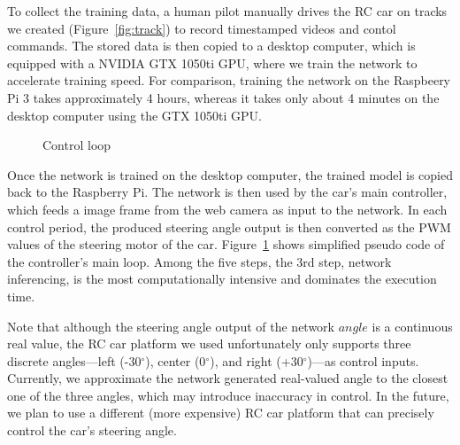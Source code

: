 To collect the training data, a human pilot manually drives the RC car
on tracks we created (Figure~\ref{fig:track}) to record
timestamped videos and contol commands. The stored data is then copied 
to a desktop computer, which is equipped with a NVIDIA GTX 1050ti GPU, 
where we train the network to accelerate training speed. 
For comparison, training the network on the Raspbeery Pi 3 takes
approximately 4 hours, whereas it takes only about 4 minutes on the
desktop computer using the GTX 1050ti GPU.

\begin{figure}[h]
  
  \caption{Control loop}
  \label{fig:controlloop}
\end{figure}

Once the network is trained on the desktop computer, the trained model
is copied back to the Raspberry Pi. The network is then used
by the car's main controller, which feeds a image frame from the web
camera as input to the network. In each control period, the produced 
steering angle output is then converted as the PWM values of the 
steering motor of the car. Figure~\ref{fig:controlloop} shows simplified 
pseudo code of the controller's main loop. Among the five steps, the 3rd step, 
network inferencing, is the most computationally intensive and dominates the
execution time.

Note that although the steering angle output of the network $angle$ is
a continuous real value, the RC car platform we used unfortunately
only supports three discrete angles---left (-30$^{\circ}$), center
(0$^{\circ}$), and right (+30$^{\circ}$)---as control inputs.
Currently, we approximate the network generated real-valued
angle to the closest one of the three angles, which may
introduce inaccuracy in control.
In the future, we plan to use a different (more expensive) RC car
platform that can precisely control the car's steering angle.

